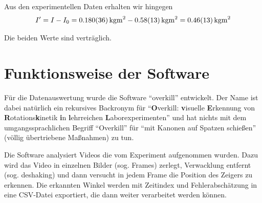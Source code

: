 \documentclass[a4paper,german,12pt,smallheadings]{scrartcl}
\begin{document}
Aus den experimentellen Daten erhalten wir hingegen
\begin{equation}
  I' = I - I_0 = \SI{0.180+-0.036}{kg m^2} - \SI{0.58+-0.13}{kg m^2} = \SI{0.46+-0.13}{kg m^2}
\end{equation}

Die beiden Werte sind verträglich.

\section{Funktionsweise der Software}
Für die Datenauswertung wurde die Software ``overkill'' entwickelt. Der Name
ist dabei natürlich ein rekursives Backronym für ``\textbf{O}verkill:
\textbf{v}isuelle \textbf{E}rkennung von \textbf{R}otations\textbf{k}inetik
\textbf{i}n \textbf{l}ehrreichen \textbf{L}aborexperimenten'' und hat nichts mit dem
umgangssprachlichen Begriff ``Overkill'' für ``mit Kanonen auf Spatzen
schießen'' (völlig übertriebene Maßnahmen) zu tun.

Die Software analysiert Videos die vom Experiment aufgenommen wurden. Dazu wird
das Video in einzelnen Bilder (sog. Frames) zerlegt, Verwacklung entfernt (sog.
deshaking) und dann versucht in jedem Frame die Position des Zeigers zu
erkennen. Die erkannten Winkel werden mit Zeitindex und Fehlerabschätzung in
eine CSV-Datei exportiert, die dann weiter verarbeitet werden können.
\end{document}

